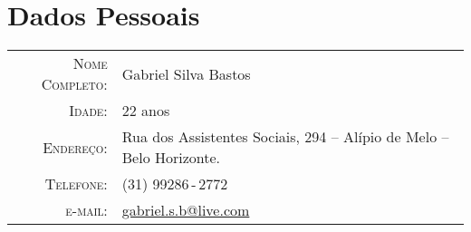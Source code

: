 \documentclass[a4paper,10pt]{article}
\renewcommand\#{\protect\scalebox{0.8}{\protect\raisebox{0.4ex}{\char"0023}}}
\begin{document}
\pagestyle{empty} %

\par{
  \bigskip
  \par
}

\section{Dados Pessoais}

\begin{tabular}{rl}
  \textsc{Nome Completo:} & Gabriel Silva Bastos \\
  \textsc{Idade:}         & 22 anos \\
  \textsc{Endereço:}      & Rua dos Assistentes Sociais, 294 -- Alípio de Melo -- Belo Horizonte. \\
  \textsc{Telefone:}      & (31) 99286\,-\,2772 \\
  \textsc{e-mail:}        & \href{mailto:gabriel.s.b@live.com}{gabriel.s.b@live.com}
\end{tabular}
\end{document}
